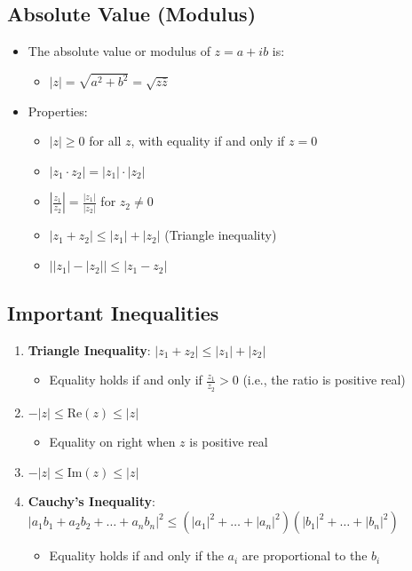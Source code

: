 \documentclass[
]{book}
\providecommand{\tightlist}{%
  \setlength{\itemsep}{0pt}\setlength{\parskip}{0pt}}
\theoremstyle{definition}
\theoremstyle{definition}
\theoremstyle{definition}
\theoremstyle{definition}
\theoremstyle{remark}
\begin{document}
\subsection{Absolute Value (Modulus)}\label{absolute-value-modulus}

\begin{itemize}
\tightlist
\item
  The absolute value or modulus of \(z = a + ib\) is:

  \begin{itemize}
  \tightlist
  \item
    \(|z| = \sqrt{a^2 + b^2} = \sqrt{z\bar{z}}\)
  \end{itemize}
\item
  Properties:

  \begin{itemize}
  \tightlist
  \item
    \(|z| \geq 0\) for all \(z\), with equality if and only if \(z = 0\)
  \item
    \(|z_1 \cdot z_2| = |z_1| \cdot |z_2|\)
  \item
    \(\left|\frac{z_1}{z_2}\right| = \frac{|z_1|}{|z_2|}\) for \(z_2 \neq 0\)
  \item
    \(|z_1 + z_2| \leq |z_1| + |z_2|\) (Triangle inequality)
  \item
    \(\left| |z_1| - |z_2| \right| \leq |z_1 - z_2|\)
  \end{itemize}
\end{itemize}

\subsection{Important Inequalities}\label{important-inequalities}

\begin{enumerate}
\def\labelenumi{\arabic{enumi}.}
\item
  \textbf{Triangle Inequality}: \(|z_1 + z_2| \leq |z_1| + |z_2|\)

  \begin{itemize}
  \tightlist
  \item
    Equality holds if and only if \(\frac{z_1}{z_2} > 0\) (i.e., the ratio is positive real)
  \end{itemize}
\item
  \(-|z| \leq \text{Re}(z) \leq |z|\)

  \begin{itemize}
  \tightlist
  \item
    Equality on right when \(z\) is positive real
  \end{itemize}
\item
  \(-|z| \leq \text{Im}(z) \leq |z|\)
\item
  \textbf{Cauchy's Inequality}: \(|a_1b_1 + a_2b_2 + \ldots + a_nb_n|^2 \leq (|a_1|^2 + \ldots + |a_n|^2)(|b_1|^2 + \ldots + |b_n|^2)\)

  \begin{itemize}
  \tightlist
  \item
    Equality holds if and only if the \(a_i\) are proportional to the \(b_i\)
  \end{itemize}
\end{enumerate}
\end{document}
